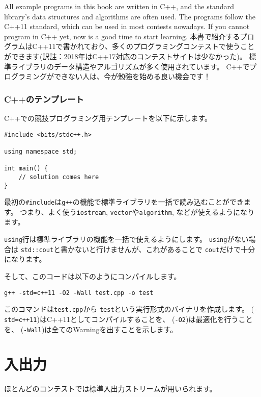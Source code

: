 All example programs in this book are written in C++,
and the standard library's
data structures and algorithms are often used.
The programs follow the C++11 standard,
which can be used in most contests nowadays.
If you cannot program in C++ yet,
now is a good time to start learning.
本書で紹介するプログラムはC++11で書かれており、多くのプログラミングコンテストで使うことができます(訳註：2018年はC++17対応のコンテストサイトは少なかった)。
標準ライブラリのデータ構造やアルゴリズムが多く使用されています。
C++でプログラミングができない人は、今が勉強を始める良い機会です！

\subsubsection{C++のテンプレート}

C++での競技プログラミング用テンプレートを以下に示します。

\begin{lstlisting}
#include <bits/stdc++.h>

using namespace std;

int main() {
    // solution comes here
}
\end{lstlisting}

最初の\texttt{\#include}は\texttt{g++}の機能で標準ライブラリを一括で読み込むことができます。
つまり、よく使う\texttt{iostream},
\texttt{vector}や\texttt{algorithm},
などが使えるようになります。

\texttt{using}行は標準ライブラリの機能を一括で使えるようにします。
\texttt{using}がない場合は
\texttt{std::cout}と書かないと行けませんが、これがあることで
\texttt{cout}だけで十分になります。

そして、このコードは以下のようにコンパイルします。

\begin{lstlisting}
g++ -std=c++11 -O2 -Wall test.cpp -o test
\end{lstlisting}

このコマンドは\texttt{test.cpp}から
\texttt{test}という実行形式のバイナリを作成します。
(\texttt{-std=c++11})はC++11としてコンパイルすることを、
(\texttt{-O2})は最適化を行うことを、
(\texttt{-Wall})は全てのWarningを出すことを示します。

\section{入出力}


ほとんどのコンテストでは標準入出力ストリームが用いられます。

